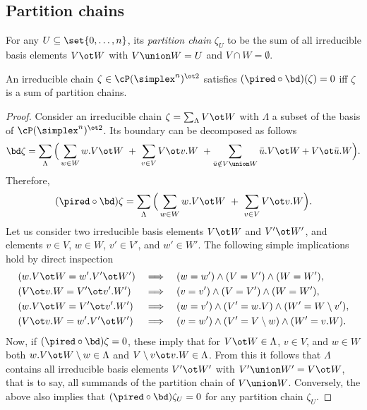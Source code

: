 \subsection{Partition chains}

For any $U \subseteq \set{0,\dots,n}$, its \textit{partition chain} $\zeta_U$ to be the sum of all irreducible basis elements $V \ot W$ with $V \union W = U$ and $V \cap W = \emptyset$.

\begin{lemma}\label{l:partition chains}
	An irreducible chain $\zeta \in \cP(\simplex^n)^{\ot 2}$ satisfies $(\pired \circ \bd)(\zeta) = 0$ iff $\zeta$ is a sum of partition chains.
\end{lemma}

\begin{proof}
	Consider an irreducible chain $\zeta = \sum_{\Lambda} V \ot W$ with $\Lambda$ a subset of the basis of $\cP(\simplex^n)^{\ot 2}$.
	Its boundary can be decomposed as follows
	\[
	\bd \zeta = \sum_{\Lambda} \Big(\sum_{w \in W} w.V \ot W \ + \ \sum_{v \in V} V \ot v.W \ +
	\sum_{\bar u \notin V \union W} \bar u.V \ot  W + V \ot \bar u.W\Big).
	\]
	Therefore,
	\[
	(\pired \circ \bd) \zeta = \sum_{\Lambda} \Big(\sum_{w \in W} w.V \ot W \ + \ \sum_{v \in V} V \ot v.W\Big).
	\]
	Let us consider two irreducible basis elements $V \ot W$ and $V' \ot W'$, and elements $v \in V$, $w \in W$, $v' \in V'$, and $w' \in W'$.
	The following simple implications hold by direct inspection
	\begin{align*}
		&(w.V \ot W = w'.V' \ot W') &\implies& &&(w = w') \wedge (V = V') \wedge (W = W'), \\
		&(V \ot v.W = V' \ot v'.W') &\implies& &&(v = v') \wedge (V = V') \wedge (W = W'), \\
		&(w.V \ot W = V' \ot v'.W') &\implies& &&(w = v') \wedge (V' = w.V) \wedge (W' = W \setminus v'), \\
		&(V \ot v.W = w'.V' \ot W') &\implies& &&(v = w') \wedge (V' = V \setminus w) \wedge (W' = v.W).
	\end{align*}
	Now, if $(\pired \circ \bd) \zeta = 0$, these imply that for $V \ot W \in \Lambda$, $v \in V$, and $w \in W$ both $w.V \ot W \setminus w \in \Lambda$ and $V \setminus v \ot v.W \in \Lambda$.
	From this it follows that $\Lambda$ contains all irreducible basis elements $V' \ot W'$ with $V' \union W' = V \ot W$, that is to say, all summands of the partition chain of $V \union W$.
	Conversely, the above also implies that $(\pired \circ \bd)\zeta_U = 0$ for any partition chain $\zeta_U$.
\end{proof}

